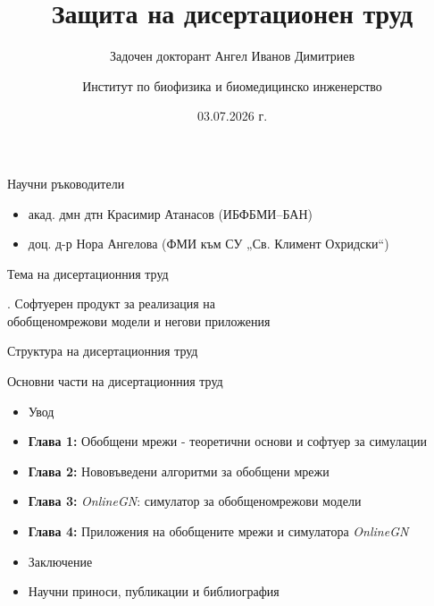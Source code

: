 \documentclass[aspectratio=169]{beamer}
\title[Защита на дисертационен труд]{Защита на дисертационен труд}
\subtitle{Задочен докторант Ангел Иванов Димитриев}
\author{Институт по биофизика и биомедицинско инженерство}
\institute{ИБФБМИ–БАН \;|\; ФМИ към СУ „Св. Климент Охридски“}
\date{03.07.2026 г.}
\begin{document}
\begin{frame}[plain]
  \titlepage
  \vspace{-1.0em}
  \begin{block}{Научни ръководители}
    \begin{itemize}
      \item акад. дмн дтн Красимир Атанасов (ИБФБМИ–БАН)
      \item доц. д-р Нора Ангелова (ФМИ към СУ „Св. Климент Охридски“)
    \end{itemize}
  \end{block}
\end{frame}

\begin{frame}{Тема на дисертационния труд}
    \begin{center}
        \begin{minipage}{0.8\textwidth}
            \begin{block}{.} 
                \centering
                \vspace{0.2cm}
                \large
                Софтуерен продукт за реализация на\\ 
                обобщеномрежови модели и негови приложения
                \vspace{0.2cm}
            \end{block}
        \end{minipage}
    \end{center}
\end{frame}

\begin{frame}{Структура на дисертационния труд}
    \begin{block}{Основни части на дисертационния труд}
        \vspace{0.15cm}

        \begin{itemize}
            \setlength{\itemsep}{0.9em}

            \item Увод
            \item \textbf{Глава 1:} Обобщени мрежи - теоретични основи и софтуер за симулации
            \item \textbf{Глава 2:} Нововъведени алгоритми за обобщени мрежи
            \item \textbf{Глава 3:} \textit{OnlineGN}: симулатор за обобщеномрежови модели
            \item \textbf{Глава 4:} Приложения на обобщените мрежи и симулатора \textit{OnlineGN}
            \item Заключение
            \item Научни приноси, публикации и библиография
        \end{itemize}

        \vspace{0.15cm}
    \end{block}
\end{frame}
\end{document}
